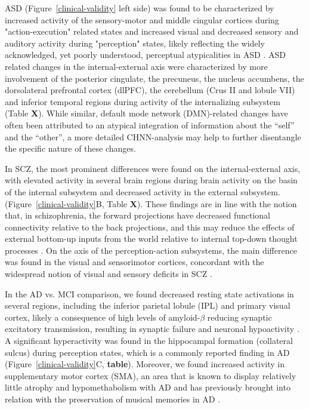 \documentclass{article}
\begin{document}
ASD (Figure~\ref{clinical-validity} left side) was found to be characterized by increased activity of the sensory-motor and middle cingular cortices during "action-execution" related states and increased visual and decreased sensory and auditory activity during "perception" states, likely reflecting the widely acknowledged, yet poorly understood, perceptual atypicalities in ASD \citep{hadad2019perception}.
ASD related changes in the internal-external axis were characterized by more involvement of the posterior cingulate, the precuneus, the nucleus accumbens, the dorsolateral prefrontal cortex (dlPFC), the cerebellum (Crus II and lobule VII) and inferior temporal regions during activity of the internalizing subsystem (Table \textbf{X}). While similar, default mode network (DMN)-related changes have often been attributed to an atypical integration of information about the ``self'' and the ``other'', a more detailed CHNN-analysis may help to further disentangle the specific nature of these changes.

In SCZ, the most prominent differences were found on the internal-external axis, with elevated activity in several brain regions during brain activity on the basin of the internal subsystem and decreased activity in the external subsystem. (Figure~\ref{clinical-validity}B, Table \textbf{X}). These findings are in line with the notion that, in schizophrenia, the forward projections have decreased functional connectivity relative to the back projections, and this may reduce the effects of external bottom-up inputs from the world relative to internal top-down thought processes \citep{rolls2021attractor}.
On the axis of the perception-action subsystems, the main difference was found in the visual and sensorimotor cortices, concordant with the widespread notion of visual and sensory deficits in SCZ \citep{javitt2009sensory, butler2008visual, adamek2022early}.

In the AD vs. MCI comparison, we found decreased resting state activations in several regions, including the inferior parietal lobule (IPL) and primary visual cortex, likely a consequence of high levels of amyloid-$\beta$ reducing synaptic excitatory transmission, resulting in synaptic failure and neuronal hypoactivity \citep{selkoe2002alzheimer}. A significant hyperactivity was found in the hippocampal formation (collateral sulcus) during perception states, which is
a commonly reported finding in AD \citep{aizenstein2015hippocampal, ewers2011neuroimaging}
(Figure~\ref{clinical-validity}C, \textbf{table}). Moreover, we found increased activity in supplementary motor cortex (SMA), an area that is known to display relatively little atrophy and hypomethabolism with AD and has previously brought into relation with the preservation of musical memories in AD \citep{jacobsen2015musical}.
\end{document}

